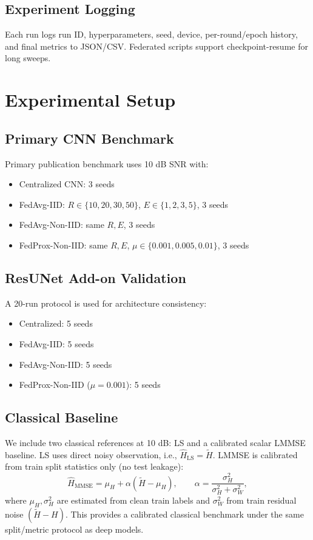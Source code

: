 \documentclass[onecolumn]{IEEEtran}
\begin{document}
\subsection{Experiment Logging}
Each run logs run ID, hyperparameters, seed, device, per-round/epoch history, and final metrics to JSON/CSV. Federated scripts support checkpoint-resume for long sweeps.

\section{Experimental Setup}
\subsection{Primary CNN Benchmark}
Primary publication benchmark uses 10 dB SNR with:
\begin{itemize}
    \item Centralized CNN: 3 seeds
    \item FedAvg-IID: $R\in\{10,20,30,50\}$, $E\in\{1,2,3,5\}$, 3 seeds
    \item FedAvg-Non-IID: same $R,E$, 3 seeds
    \item FedProx-Non-IID: same $R,E$, $\mu\in\{0.001,0.005,0.01\}$, 3 seeds
\end{itemize}

\subsection{ResUNet Add-on Validation}
A 20-run protocol is used for architecture consistency:
\begin{itemize}
    \item Centralized: 5 seeds
    \item FedAvg-IID: 5 seeds
    \item FedAvg-Non-IID: 5 seeds
    \item FedProx-Non-IID ($\mu=0.001$): 5 seeds
\end{itemize}

\subsection{Classical Baseline}
We include two classical references at 10 dB: LS and a calibrated scalar LMMSE baseline. LS uses direct noisy observation, i.e., $\hat H_{\mathrm{LS}}=\tilde H$. LMMSE is calibrated from train split statistics only (no test leakage):
\begin{equation}
\hat H_{\mathrm{MMSE}} = \mu_H + \alpha(\tilde H-\mu_H),\qquad
\alpha = \frac{\sigma_H^2}{\sigma_H^2+\sigma_W^2},
\end{equation}
where $\mu_H,\sigma_H^2$ are estimated from clean train labels and $\sigma_W^2$ from train residual noise $(\tilde H-H)$. This provides a calibrated classical benchmark under the same split/metric protocol as deep models.
\end{document}
